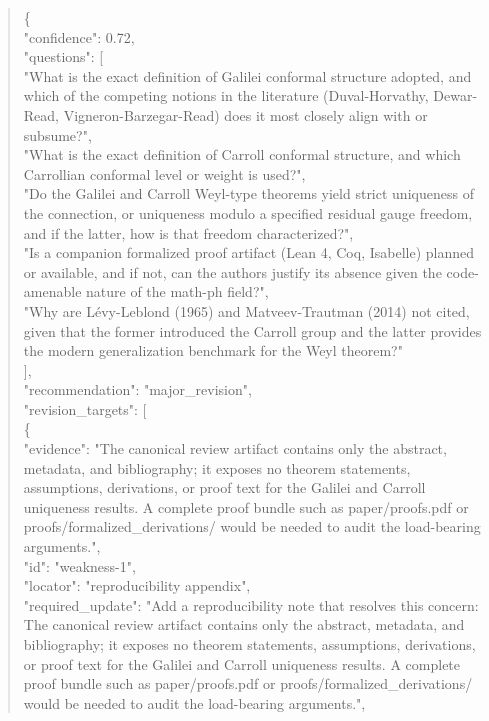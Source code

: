 \documentclass[11pt]{article}
\begin{document}
\begin{quote}\small\ttfamily\raggedright
\{\\
  "confidence": 0.72,\\
  "questions": [\\
    "What is the exact definition of Galilei conformal structure adopted, and which of the competing notions in the literature (Duval-Horvathy, Dewar-Read, Vigneron-Barzegar-Read) does it most closely align with or subsume?",\\
    "What is the exact definition of Carroll conformal structure, and which Carrollian conformal level or weight is used?",\\
    "Do the Galilei and Carroll Weyl-type theorems yield strict uniqueness of the connection, or uniqueness modulo a specified residual gauge freedom, and if the latter, how is that freedom characterized?",\\
    "Is a companion formalized proof artifact (Lean 4, Coq, Isabelle) planned or available, and if not, can the authors justify its absence given the code-amenable nature of the math-ph field?",\\
    "Why are Lévy-Leblond (1965) and Matveev-Trautman (2014) not cited, given that the former introduced the Carroll group and the latter provides the modern generalization benchmark for the Weyl theorem?"\\
  ],\\
  "recommendation": "major\_revision",\\
  "revision\_targets": [\\
    \{\\
      "evidence": "The canonical review artifact contains only the abstract, metadata, and bibliography; it exposes no theorem statements, assumptions, derivations, or proof text for the Galilei and Carroll uniqueness results. A complete proof bundle such as paper/proofs.pdf or proofs/formalized\_derivations/ would be needed to audit the load-bearing arguments.",\\
      "id": "weakness-1",\\
      "locator": "reproducibility appendix",\\
      "required\_update": "Add a reproducibility note that resolves this concern: The canonical review artifact contains only the abstract, metadata, and bibliography; it exposes no theorem statements, assumptions, derivations, or proof text for the Galilei and Carroll uniqueness results. A complete proof bundle such as paper/proofs.pdf or proofs/formalized\_derivations/ would be needed to audit the load-bearing arguments.",\\

\end{quote}
\end{document}
